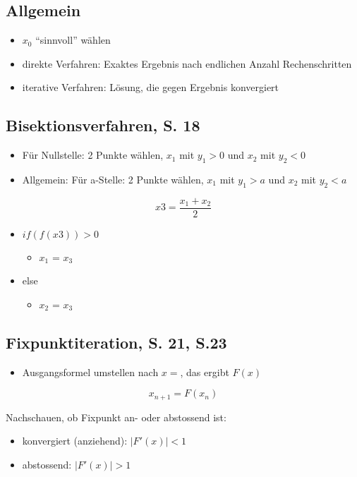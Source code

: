 
\subsection{Allgemein}
\begin{itemize}
\item $x_0$ "`sinnvoll"' wählen
\item direkte Verfahren: Exaktes Ergebnis nach endlichen Anzahl Rechenschritten
\item iterative Verfahren: Lösung, die gegen Ergebnis konvergiert
\end{itemize}

\subsection{Bisektionsverfahren, S. 18}

\begin{itemize}
\item Für Nullstelle: 2 Punkte wählen, $x_1$ mit $y_1 > 0$ und $x_2$ mit $y_2 < 0$
\item Allgemein: Für a-Stelle: 2 Punkte wählen, $x_1$ mit $y_1 > a$ und $x_2$ mit $y_2 < a$
\end{itemize}
\[x3 = \frac{x_1 + x_2}{2}\]

\begin{itemize}
\item $if(f(x3)) > 0$
\begin{itemize}
\item $x_1$ = $x_3$
\end{itemize}
\item else
\begin{itemize}
\item $x_2$ = $x_3$
\end{itemize}
\end{itemize}

\subsection{Fixpunktiteration, S. 21, S.23}
\begin{itemize}
\item Ausgangsformel umstellen nach $x = $, das ergibt $F(x)$
\end{itemize}
\[x_{n+1} = F(x_n)\]

Nachschauen, ob Fixpunkt an- oder abstossend ist:
\begin{itemize}
\item konvergiert (anziehend): $|F'(x)| < 1$
\item abstossend: $|F'(x)| > 1$
\end{itemize}


